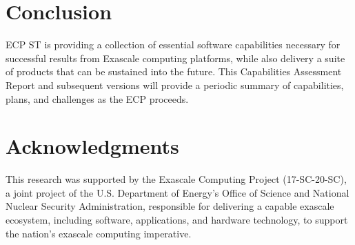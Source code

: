 \documentclass{ecpreport-publicv1}
\newcommand{\nnsa}{NNSA ST}
\begin{document}





\newpage

\section{Conclusion}

ECP ST is providing a collection of essential software capabilities necessary for successful results from Exascale computing platforms, while also delivery a suite of products that can be sustained into the future.  This Capabilities Assessment Report and subsequent versions will provide a periodic summary of capabilities, plans, and challenges as the ECP proceeds.
\newpage
\section*{Acknowledgments}

This research was supported by the Exascale Computing Project (17-SC-20-SC), a joint project of the U.S. Department of Energy’s Office of Science and National Nuclear Security Administration, responsible for delivering a capable exascale ecosystem, including software, applications, and hardware technology, to support the nation’s exascale computing imperative.
\end{document}
